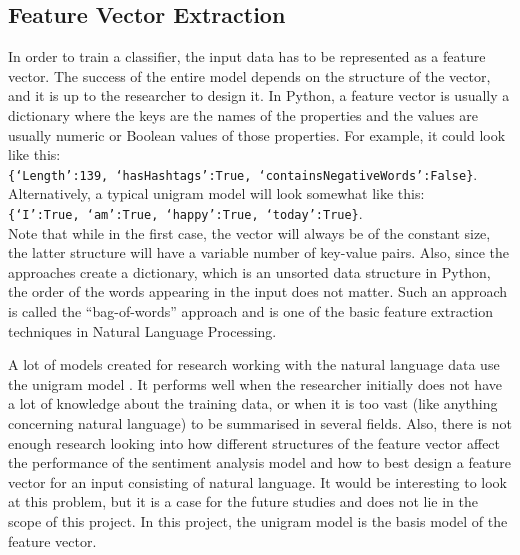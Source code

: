 \subsection{Feature Vector Extraction}
In order to train a classifier, the input data has to be represented as a feature vector. The success of the entire model depends on the structure of the vector, and it is up to the researcher to design it. In Python, a feature vector is usually a dictionary where the keys are the names of the properties and the values are usually numeric or Boolean values of those properties. For example, it could look like this: \\ \texttt{\{`Length':139, `hasHashtags':True, `containsNegativeWords':False\}}. \\Alternatively, a typical unigram model will look somewhat like this:\\ \texttt{\{`I':True, `am':True, `happy':True, `today':True\}}.\\Note that while in the first case, the vector will always be of the constant size, the latter structure will have a variable number of key-value pairs. Also, since the approaches create a dictionary, which is an unsorted data structure in Python, the order of the words appearing in the input does not matter. Such an approach is called the ``bag-of-words'' approach and is one of the basic feature extraction techniques in Natural Language Processing.  

 A lot of models created for research working with the natural language data use the unigram model \cite{agarwal2011sentiment}. It performs well when the researcher initially does not have a lot of knowledge about the training data, or when it is too vast (like anything concerning natural language) to be summarised in several fields. Also, there is not enough research looking into how different structures of the feature vector affect the performance of the sentiment analysis model and how to best design a feature vector for an input consisting of natural language. It would be interesting to look at this problem, but it is a case for the future studies and does not lie in the scope of this project. In this project, the unigram model is the basis model of the feature vector.  

